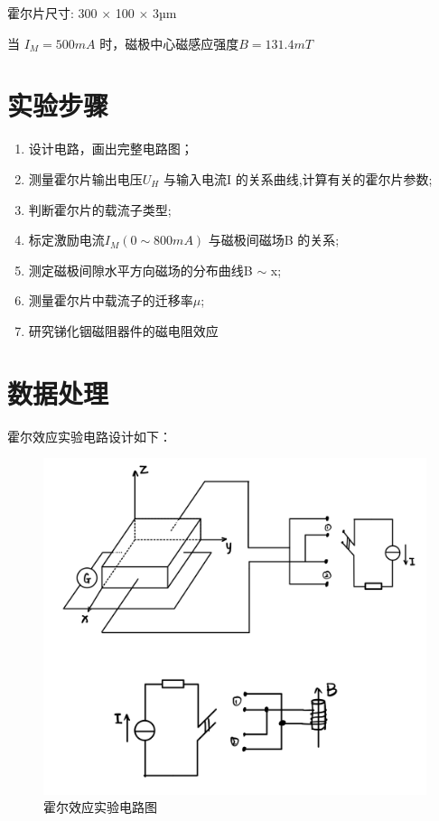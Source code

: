 \documentclass[UTF8]{ctexart}
\begin{document}
     霍尔片尺寸: 300 $\times$ 100 $\times$ 3µm

     当 $I_M = 500mA$ 时，磁极中心磁感应强度$ B = 131.4mT$

\section{实验步骤}
\begin{enumerate}
  \item 设计电路，画出完整电路图；
  \item 测量霍尔片输出电压$U_H$ 与输入电流I 的关系曲线,计算有关的霍尔片参数;
  \item 判断霍尔片的载流子类型;
  \item 标定激励电流$I_M(0 \sim 800mA)$ 与磁极间磁场B 的关系;
  \item 测定磁极间隙水平方向磁场的分布曲线B $\sim$ x;
  \item 测量霍尔片中载流子的迁移率$\mu$;
  \item 研究锑化铟磁阻器件的磁电阻效应
\end{enumerate}

\section{数据处理}

霍尔效应实验电路设计如下：

\begin{figure}[H]
  \centering
  \includegraphics[scale=0.15]{电路.jpg}
  \caption{霍尔效应实验电路图} %
\end{figure}
\end{document}
